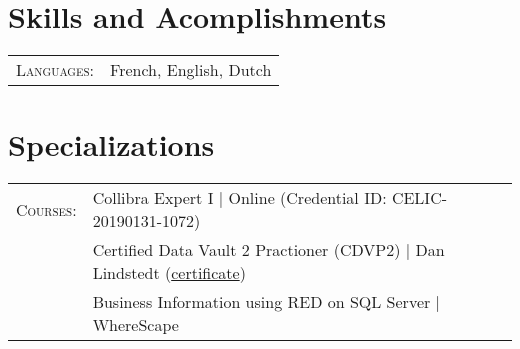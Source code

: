 \documentclass[a4paper,10pt]{article}
\begin{document}
\section{Skills and Acomplishments}
\begin{tabular}{rl}
  \textsc{Languages:}& French, English, Dutch\\
\end{tabular}

\section{Specializations}
\begin{tabular}{rl}
  \textsc{Courses:}
  &Collibra Expert I | Online (Credential ID: CELIC-20190131-1072)\\
  &Certified Data Vault 2 Practioner (CDVP2) | Dan Lindstedt (\href{http://keyldv.com/}{certificate})\\
  &Business Information using RED on SQL Server | WhereScape
\end{tabular}
\end{document}
